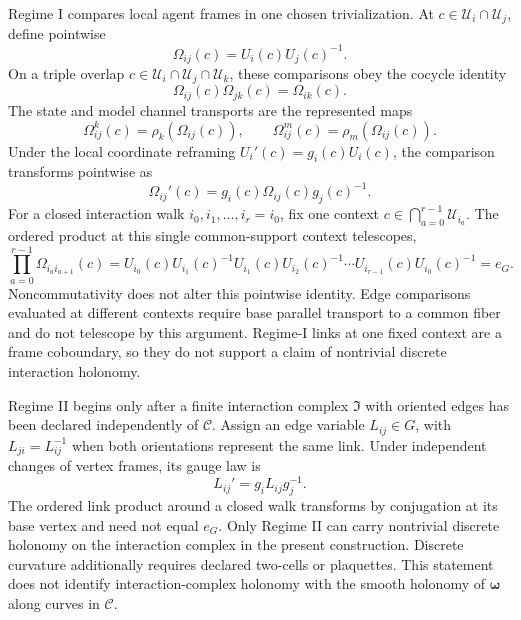 Regime I compares local agent frames in one chosen trivialization. At \(c\in\mathcal U_i\cap\mathcal U_j\), define pointwise
\begin{equation}
\Omega_{ij}(c)=U_i(c)U_j(c)^{-1}.
\end{equation}
On a triple overlap \(c\in\mathcal U_i\cap\mathcal U_j\cap\mathcal U_k\), these comparisons obey the cocycle identity
\begin{equation}
\Omega_{ij}(c)\Omega_{jk}(c)=\Omega_{ik}(c).
\label{eq:regime-one-cocycle}
\end{equation}
The state and model channel transports are the represented maps
\begin{equation}
\Omega_{ij}^{k}(c)=\rho_k(\Omega_{ij}(c)),
\qquad
\Omega_{ij}^{m}(c)=\rho_m(\Omega_{ij}(c)).
\label{eq:represented-regime-one-links}
\end{equation}
Under the local coordinate reframing \(U_i'(c)=g_i(c)U_i(c)\), the comparison transforms pointwise as
\begin{equation}
\Omega_{ij}'(c)=g_i(c)\Omega_{ij}(c)g_j(c)^{-1}.
\label{eq:regime-one-gauge-law}
\end{equation}
For a closed interaction walk \(i_0,i_1,\ldots,i_r=i_0\), fix one context \(c\in\bigcap_{a=0}^{r-1}\mathcal U_{i_a}\). The ordered product at this single common-support context telescopes,
\begin{equation}
\prod_{a=0}^{r-1}\Omega_{i_a i_{a+1}}(c)
=U_{i_0}(c)U_{i_1}(c)^{-1}U_{i_1}(c)U_{i_2}(c)^{-1}\cdots
U_{i_{r-1}}(c)U_{i_0}(c)^{-1}
=e_G.
\label{eq:regime-one-loop-telescoping}
\end{equation}
Noncommutativity does not alter this pointwise identity. Edge comparisons evaluated at different contexts require base parallel transport to a common fiber and do not telescope by this argument. Regime-I links at one fixed context are a frame coboundary, so they do not support a claim of nontrivial discrete interaction holonomy.

Regime II begins only after a finite interaction complex \(\mathfrak I\) with oriented edges has been declared independently of \(\mathcal C\). Assign an edge variable \(L_{ij}\in G\), with \(L_{ji}=L_{ij}^{-1}\) when both orientations represent the same link. Under independent changes of vertex frames, its gauge law is
\begin{equation}
L_{ij}'=g_iL_{ij}g_j^{-1}.
\label{eq:regime-two-gauge-law}
\end{equation}
The ordered link product around a closed walk transforms by conjugation at its base vertex and need not equal \(e_G\). Only Regime II can carry nontrivial discrete holonomy on the interaction complex in the present construction. Discrete curvature additionally requires declared two-cells or plaquettes. This statement does not identify interaction-complex holonomy with the smooth holonomy of \(\boldsymbol\omega\) along curves in \(\mathcal C\).

